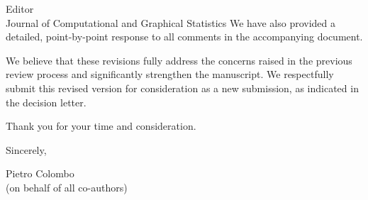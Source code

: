 \documentclass[11pt]{letter}
\begin{document}
\begin{letter}{Editor\\
Journal of Computational and Graphical Statistics}
We have also provided a detailed, point-by-point response to all comments in the accompanying document.

We believe that these revisions fully address the concerns raised in the previous review process and significantly strengthen the manuscript. We respectfully submit this revised version for consideration as a new submission, as indicated in the decision letter.

Thank you for your time and consideration.

\closing{Sincerely,}

\vspace{1cm}

Pietro Colombo\\
(on behalf of all co-authors)

\end{letter}
\end{document}
